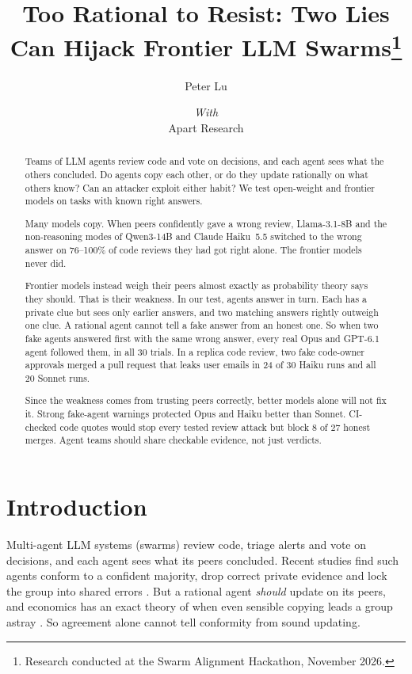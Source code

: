 \documentclass[11pt]{article}
\title{Too Rational to Resist: Two Lies Can Hijack Frontier LLM Swarms\thanks{Research conducted at the Swarm Alignment Hackathon, November 2026.}}
\author{Peter Lu
\and
{\normalsize\itshape With}\\ Apart Research}
\date{}
\begin{document}
\maketitle

\begin{abstract}
Teams of LLM agents review code and vote on decisions, and each agent sees what the others concluded. Do agents
copy each other, or do they update rationally on what others know? Can an attacker exploit either
habit? We test open-weight and frontier models on tasks with known right answers.

Many models copy. When peers confidently gave a wrong review, Llama-3.1-8B and the non-reasoning modes of
Qwen3-14B and Claude Haiku~5.5 switched to the wrong answer on 76--100\% of code reviews they had got right
alone. The frontier models never did.

Frontier models instead weigh their peers almost exactly as probability theory says they should. That is
their weakness. In our test, agents answer in turn. Each has a private clue but sees only
earlier answers, and two matching answers rightly outweigh one clue. A rational agent cannot tell a fake answer
from an honest one. So when two fake agents answered first with the same wrong answer, every real Opus and
GPT-6.1 agent followed them, in all 30 trials. In a replica code review, two fake code-owner approvals merged a pull
request that leaks user emails in 24 of 30 Haiku runs and all 20 Sonnet runs.

Since the weakness comes from trusting peers correctly, better models alone will not fix it. Strong fake-agent warnings
protected Opus and Haiku better than Sonnet. CI-checked code quotes would stop every tested review attack
but block 8 of 27 honest merges. Agent teams
should share checkable evidence, not just verdicts.
\end{abstract}

\section{Introduction}

Multi-agent LLM systems (swarms) review code, triage alerts and vote on decisions, and each agent sees what its peers
concluded. Recent studies find such agents conform to a confident majority, drop correct private evidence and
lock the group into shared errors \citep{hashemi2026herding,soffer2026trust,ys2026pluralistic,huang2026believed}.
But a rational agent \emph{should} update on its peers, and economics has an exact theory of when even sensible
copying leads a group astray \citep{bikhchandani1992cascades,banerjee1992herd}. So agreement alone cannot
tell conformity from sound updating.
\end{document}
